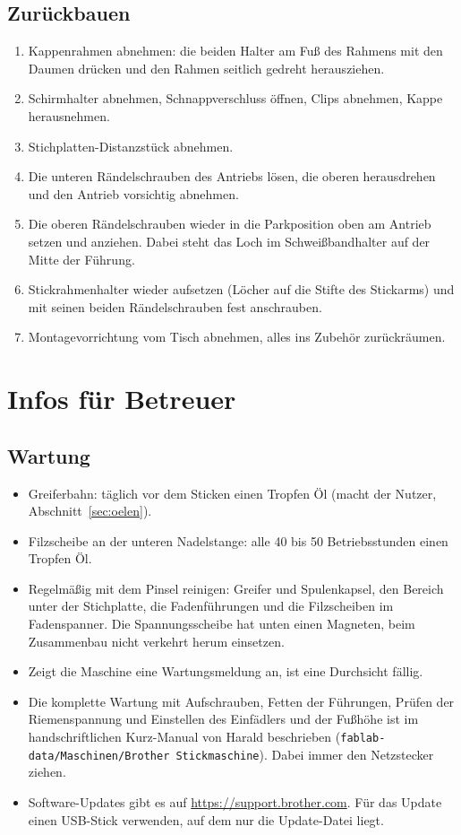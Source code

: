 \documentclass{\basedir/fablab-document}
\begin{document}
	\subsection{Zurückbauen}
	\begin{enumerate}
		\item Kappenrahmen abnehmen: die beiden Halter am Fuß des Rahmens mit den Daumen drücken und den Rahmen seitlich gedreht herausziehen.
		\item Schirmhalter abnehmen, Schnappverschluss öffnen, Clips abnehmen, Kappe herausnehmen.
		\item Stichplatten-Distanzstück abnehmen.
		\item Die unteren Rändelschrauben des Antriebs lösen, die oberen herausdrehen und den Antrieb vorsichtig abnehmen.
		\item Die oberen Rändelschrauben wieder in die Parkposition oben am Antrieb setzen und anziehen. Dabei steht das Loch im Schweißbandhalter auf der Mitte der Führung.
		\item Stickrahmenhalter wieder aufsetzen (Löcher auf die Stifte des Stickarms) und mit seinen beiden Rändelschrauben fest anschrauben.
		\item Montagevorrichtung vom Tisch abnehmen, alles ins Zubehör zurückräumen.
	\end{enumerate}

	\section{Infos für Betreuer}

	\subsection{Wartung}
	\begin{itemize}
		\item Greiferbahn: täglich vor dem Sticken einen Tropfen Öl (macht der Nutzer, Abschnitt~\ref{sec:oelen}).
		\item Filzscheibe an der unteren Nadelstange: alle 40 bis 50 Betriebsstunden einen Tropfen Öl.
		\item Regelmäßig mit dem Pinsel reinigen: Greifer und Spulenkapsel, den Bereich unter der Stichplatte, die Fadenführungen und die Filzscheiben im Fadenspanner. Die Spannungsscheibe hat unten einen Magneten, beim Zusammenbau nicht verkehrt herum einsetzen.
		\item Zeigt die Maschine eine Wartungsmeldung an, ist eine Durchsicht fällig.
		\item Die komplette Wartung mit Aufschrauben, Fetten der Führungen, Prüfen der Riemenspannung und Einstellen des Einfädlers und der Fußhöhe ist im handschriftlichen Kurz-Manual von Harald beschrieben (\texttt{fablab-data/Maschinen/Brother Stickmaschine}). Dabei immer den Netzstecker ziehen.
		\item Software-Updates gibt es auf \url{https://support.brother.com}. Für das Update einen USB-Stick verwenden, auf dem nur die Update-Datei liegt.
	\end{itemize}
\end{document}

